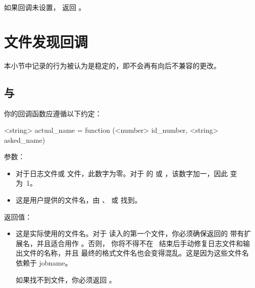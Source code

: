 如果回调未设置， 返回 。

\section{文件发现回调}

本小节中记录的行为被认为是稳定的，即不会再有向后不兼容的更改。

\subsection{ 与 }

你的回调函数应遵循以下约定：

\begin{typing}
<string> actual_name =
    function (<number> id_number, <string> asked_name)
\end{typing}

参数：

\begin{itemize}
\item[\\texttt{id\_number}]

对于日志文件或  文件，此数字为零。对于 \TEX 的 
或 ，该数字加一，因此  变为~1。

\item[\\texttt{asked\_name}]

这是用户提供的文件名，由 、 或 
找到。

\end{itemize}

返回值：

\begin{itemize}
\item[\\texttt{actual\_name}]

这是实际使用的文件名。对于 \TEX 读入的第一个文件，你必须确保返回的
 带有扩展名，并且适合用作 。否则，
你将不得不在 \LUATEX\ 结束后手动修复日志文件和输出文件的名称，并且
最终的格式文件名也会变得混乱。这是因为这些文件名依赖于 jobname。

如果找不到文件，你必须返回 。

\end{itemize}

\subsection{}

